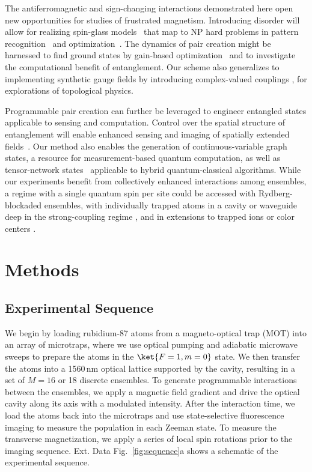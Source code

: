 \documentclass[aps,pra,twocolumn,superscriptaddress]{revtex4-1} %
\begin{document}
\begin{bibunit}
The antiferromagnetic and sign-changing interactions demonstrated here open new opportunities for studies of frustrated magnetism.  Introducing disorder will allow for realizing spin-glass models~\cite{gopalakrishnan2011frustration,strack2011dicke} that map to NP hard problems in pattern recognition~\cite{Amit1985,marsh2021enhancing} and optimization~\cite{berloff2017realizing}.  The dynamics of pair creation might be harnessed to find ground states by gain-based optimization~\cite{mcmahon2016fully,berloff2017realizing} and to investigate the computational benefit of entanglement.  Our scheme also generalizes to implementing synthetic gauge fields by introducing complex-valued couplings \cite{rudner2020band}, for explorations of topological physics.

Programmable pair creation can further be leveraged to engineer entangled states applicable to sensing \cite{hamley2012spin,masson2017cavity} and computation.  Control over the spatial structure of entanglement will enable enhanced sensing and imaging of spatially extended fields~\cite{Pezze2018}.  Our method also enables the generation of continuous-variable graph states, a resource for measurement-based quantum computation, as well as tensor-network states~\cite{shi2006classical,murg2010simulating} applicable to hybrid quantum-classical algorithms.  While our experiments benefit from collectively enhanced interactions among ensembles, a regime with a single quantum spin per site could be accessed with Rydberg-blockaded ensembles, with individually trapped atoms in a cavity or waveguide deep in the strong-coupling regime \cite{hung2016quantum}, and in extensions to trapped ions \cite{ozeri2020quantum} or color centers \cite{evans2018photon}.

\section*{Methods}

\subsection{Experimental Sequence}
We begin by loading rubidium-87 atoms from a magneto-optical trap (MOT) into an array of microtraps, where we use optical pumping and adiabatic microwave sweeps to prepare the atoms in the $\ket{F = 1, m = 0}$ state. We then transfer the atoms into a 1560\,nm optical lattice supported by the cavity, resulting in a set of $M = 16$ or 18 discrete ensembles.
To generate programmable interactions between the ensembles, we apply a magnetic field gradient and drive the optical cavity along its axis with a modulated intensity. 
After the interaction time, we load the atoms back into the microtraps and use state-selective fluorescence imaging to measure the population in each Zeeman state.  To measure the transverse magnetization, we apply a series of local spin rotations prior to the imaging sequence.  Ext. Data Fig.~\ref{fig:sequence}a shows a schematic of the experimental sequence.



\end{bibunit}
\end{document}
